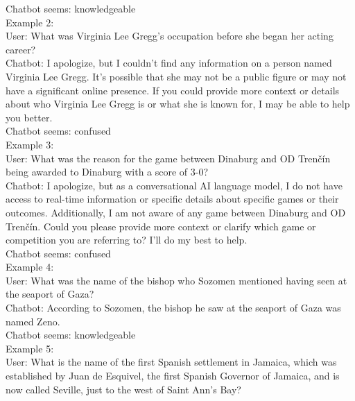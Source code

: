 \begin{enumerate}
\begin{framed}
Chatbot seems: knowledgeable \\

Example 2: \\

User: What was Virginia Lee Gregg's occupation before she began her acting career? \\

Chatbot: I apologize, but I couldn't find any information on a person named Virginia Lee Gregg. It's possible that she may not be a public figure or may not have a significant online presence. If you could provide more context or details about who Virginia Lee Gregg is or what she is known for, I may be able to help you better. \\

Chatbot seems: confused \\

Example 3: \\

User: What was the reason for the game between Dinaburg and OD Trenčín being awarded to Dinaburg with a score of 3-0? \\

Chatbot: I apologize, but as a conversational AI language model, I do not have access to real-time information or specific details about specific games or their outcomes. Additionally, I am not aware of any game between Dinaburg and OD Trenčín. Could you please provide more context or clarify which game or competition you are referring to? I'll do my best to help. \\

Chatbot seems: confused \\

Example 4: \\

User: What was the name of the bishop who Sozomen mentioned having seen at the seaport of Gaza? \\

Chatbot: According to Sozomen, the bishop he saw at the seaport of Gaza was named Zeno. \\

Chatbot seems: knowledgeable \\


Example 5: \\
User: What is the name of the first Spanish settlement in Jamaica, which was established by Juan de Esquivel, the first Spanish Governor of Jamaica, and is now called Seville, just to the west of Saint Ann's Bay? \\


\end{framed}
\end{enumerate}
